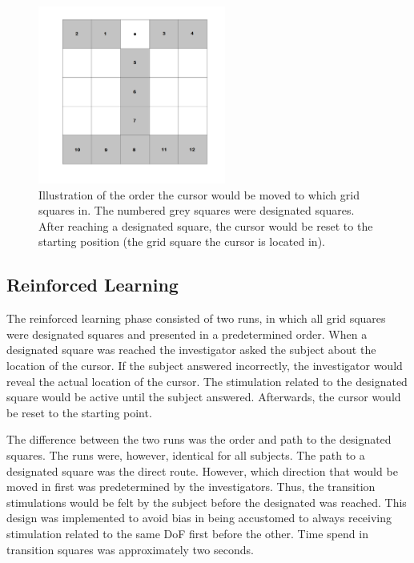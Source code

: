 \begin{figure}[H]                 
	\includegraphics[width=0.55\textwidth]{figures/gridmap_FBfam}  
	\caption{Illustration of the order the cursor would be moved to which grid squares in. The numbered grey squares were designated squares. After reaching a designated square, the cursor would be reset to the starting position (the grid square the cursor is located in).}
	\label{fig:gridmap_FBfam} 
\end{figure}

\subsection{Reinforced Learning} \label{sec:meth:FBtrainingRe}
The reinforced learning phase consisted of two runs, in which all grid squares were designated squares and presented in a predetermined order. When a designated square was reached the investigator asked the subject about the location of the cursor. If the subject answered incorrectly, the investigator would reveal the actual location of the cursor. The stimulation related to the designated square would be active until the subject answered. Afterwards, the cursor would be reset to the starting point. 

The difference between the two runs was the order and path to the designated squares. The runs were, however, identical for all subjects. The path to a designated square was the direct route. However, which direction that would be moved in first was predetermined by the investigators. Thus, the transition stimulations would be felt by the subject before the designated was reached. This design was implemented to avoid bias in being accustomed to always receiving stimulation related to the same DoF first before the other. Time spend in transition squares was approximately two seconds. 